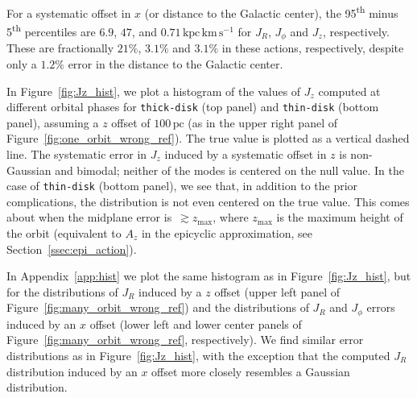 \documentclass[twocolumn]{aastex62}
\newcommand{\pc}{\text{pc}}
\newcommand{\kms}{\text{km}\,\text{s}^{-1}}
\newcommand{\actunit}{\text{kpc}\,\kms}
\newcommand{\thin}{\texttt{thin-disk}}
\newcommand{\thick}{\texttt{thick-disk}}
\begin{document}
For a systematic offset in $x$ (or distance to the Galactic center), the
95\textsuperscript{th} minus 5\textsuperscript{th} percentiles are $6.9$,
$47$, and $0.71\,\actunit$ for $J_R$, $J_{\phi}$ and $J_z$, respectively.
These are fractionally $21\%$, $3.1\%$ and $3.1\%$ in these actions,
respectively, despite only a $1.2\%$ error in the distance to the Galactic
center.

In Figure~\ref{fig:Jz_hist}, we plot a histogram of the values of $J_z$
computed at different orbital phases for \thick{} (top panel) and \thin{}
(bottom panel), assuming a $z$ offset of $100\,\pc$ (as in the upper right
panel of Figure~\ref{fig:one_orbit_wrong_ref}). The true value is plotted as a
vertical dashed line. The systematic error in $J_z$ induced by a systematic
offset in $z$ is non-Gaussian and bimodal; neither of the modes is centered on
the null value. In the case of \thin{} (bottom panel), we see that, in
addition to the prior complications, the distribution is not even centered on
the true value. This comes about when the midplane error is~$\gtrsim
z_{\text{max}}$, where $z_{\text{max}}$ is the maximum height of the orbit
(equivalent to $A_z$ in the epicyclic approximation, see
Section~\ref{ssec:epi_action}).

In Appendix~\ref{app:hist} we plot the same histogram as in
Figure~\ref{fig:Jz_hist}, but for the distributions of $J_R$ induced by a $z$
offset (upper left panel of Figure~\ref{fig:many_orbit_wrong_ref}) and the
distributions of $J_R$ and $J_{\phi}$ errors induced by an $x$ offset (lower
left and lower center panels of Figure~\ref{fig:many_orbit_wrong_ref},
respectively). We find similar error distributions as in
Figure~\ref{fig:Jz_hist}, with the exception that the computed $J_R$
distribution induced by an $x$ offset more closely resembles a Gaussian
distribution.
\end{document}
